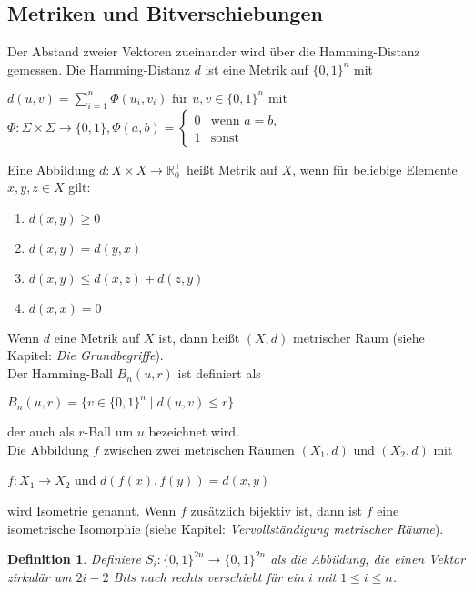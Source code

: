 \documentclass[11pt]{article}
\newtheorem{def1}{Definition}
\theoremstyle{break}
\theoremstyle{norm}
\begin{document}
\subsection{Metriken und Bitverschiebungen}
\label{metrik}
Der Abstand zweier Vektoren zueinander wird über die Hamming-Distanz gemessen. Die Hamming-Distanz $d$ ist eine Metrik auf $\{0,1\}^n$ mit
\begin{center}
 $d(u,v) =\sum_{i=1}^n\Phi(u_i,v_i) \text{ für } u,v \in \{0,1\}^n \text{ mit }$\\
 \vspace{0.5em}
   $\Phi: \Sigma \times \Sigma \rightarrow \{0,1\}, \Phi(a,b) =
\begin{cases}
0 & \text{wenn } a = b,\\
1 & \text{sonst}
\end{cases}$
\end{center}
Eine Abbildung $d: X \times X \rightarrow \mathbb{R}^+_0$ heißt Metrik auf $X$, wenn für beliebige Elemente $x, y, z \in X$ gilt:
     \begin{enumerate}
        \item $d(x,y)\geq0$
        \item $d(x,y) = d(y,x)$
        \item $d(x,y)\leq d(x,z) + d(z,y)$
        \item $d(x,x) = 0$
    \end{enumerate}
Wenn $d$ eine Metrik auf $X$ ist, dann heißt $(X,d)$ metrischer Raum (siehe \cite{Jänich1996} Kapitel: \textit{Die Grundbegriffe}).\\
Der Hamming-Ball $B_n(u,r)$ ist definiert als  
\begin{center}
$B_n(u,r)=\{v\in\{0,1\}^n \mid d(u,v) \leq r\}$
\end{center}
der auch als $r$-Ball um $u$ bezeichnet wird. \\
Die Abbildung $f$ zwischen zwei metrischen Räumen $(X_1,d)$ und $(X_2,d)$ mit \begin{center}
    $f: X_1 \rightarrow X_2$ und $d(f(x), f(y)) = d(x,y)$
\end{center} wird Isometrie genannt. Wenn $f$ zusätzlich bijektiv ist, dann ist $f$ eine isometrische Isomorphie (siehe \cite{Jänich1996} Kapitel: \textit{Vervollständigung metrischer Räume}).
\begin{def1}
    Definiere $S_i: \{0,1\}^{2n} \rightarrow \{0,1\}^{2n}$ als die Abbildung, die einen Vektor zirkulär um $2i-2$ Bits nach rechts verschiebt für ein $i$ mit $1\leq i \leq n$.
\end{def1}
\end{document}
